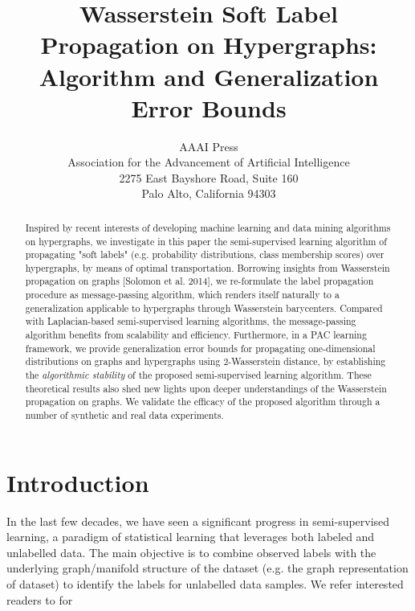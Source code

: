 \documentclass[letterpaper]{article} %
\begin{document}
\title{Wasserstein Soft Label Propagation on Hypergraphs: Algorithm and Generalization Error Bounds}
\author{AAAI Press\\
Association for the Advancement of Artificial Intelligence\\
2275 East Bayshore Road, Suite 160\\
Palo Alto, California 94303\\
}
\maketitle

\begin{abstract}
Inspired by recent interests of developing machine learning and data mining algorithms on hypergraphs, we investigate in this paper the semi-supervised learning algorithm of propagating "soft labels" (e.g. probability distributions, class membership scores) over hypergraphs, by means of optimal transportation. Borrowing insights from Wasserstein propagation on graphs [Solomon et al. 2014], we re-formulate the label propagation procedure as message-passing algorithm, which renders itself naturally to a generalization applicable to hypergraphs through Wasserstein barycenters. Compared with Laplacian-based semi-supervised learning algorithms, the message-passing algorithm benefits from scalability and efficiency. Furthermore, in a PAC learning framework, we provide generalization error bounds for propagating one-dimensional distributions on graphs and hypergraphs using 2-Wasserstein distance, by establishing the \textit{algorithmic stability} of the proposed semi-supervised learning algorithm. These theoretical results also shed new lights upon deeper understandings of the Wasserstein propagation on graphs. We validate the efficacy of the proposed algorithm through a number of synthetic and real data experiments.
\end{abstract}
	
\section{Introduction}
In the last few decades, we have seen a significant progress in semi-supervised learning, a paradigm of statistical learning that leverages both labeled and unlabelled data. The main objective is to combine observed labels with the underlying graph/manifold structure of the dataset (e.g. the graph representation of dataset) to identify the labels for unlabelled data samples. We refer interested readers to \cite{Zhu06SSL} for
\end{document}
